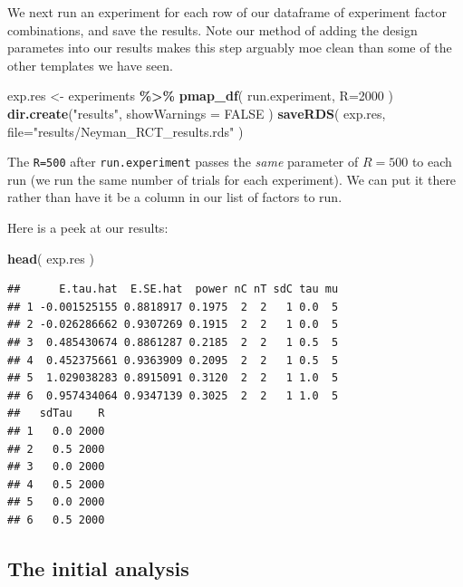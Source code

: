 \documentclass[
]{book}
\newenvironment{Shaded}{\begin{snugshade}}{\end{snugshade}}
\newcommand{\AttributeTok}[1]{\textcolor[rgb]{0.13,0.29,0.53}{#1}}
\newcommand{\ConstantTok}[1]{\textcolor[rgb]{0.56,0.35,0.01}{#1}}
\newcommand{\DecValTok}[1]{\textcolor[rgb]{0.00,0.00,0.81}{#1}}
\newcommand{\FunctionTok}[1]{\textcolor[rgb]{0.13,0.29,0.53}{\textbf{#1}}}
\newcommand{\NormalTok}[1]{#1}
\newcommand{\OtherTok}[1]{\textcolor[rgb]{0.56,0.35,0.01}{#1}}
\newcommand{\SpecialCharTok}[1]{\textcolor[rgb]{0.81,0.36,0.00}{\textbf{#1}}}
\newcommand{\StringTok}[1]{\textcolor[rgb]{0.31,0.60,0.02}{#1}}
\begin{document}
We next run an experiment for each row of our dataframe of experiment factor
combinations, and save the results.
Note our method of adding the design parametes into our results makes this step arguably moe clean than some of the other templates we have seen.

\begin{Shaded}
\begin{Highlighting}[]
\NormalTok{exp.res }\OtherTok{\textless{}{-}}\NormalTok{ experiments }\SpecialCharTok{\%\textgreater{}\%} \FunctionTok{pmap\_df}\NormalTok{( run.experiment, }\AttributeTok{R=}\DecValTok{2000}\NormalTok{ )}
\FunctionTok{dir.create}\NormalTok{(}\StringTok{"results"}\NormalTok{, }\AttributeTok{showWarnings =} \ConstantTok{FALSE}\NormalTok{ )}
\FunctionTok{saveRDS}\NormalTok{( exp.res, }\AttributeTok{file=}\StringTok{"results/Neyman\_RCT\_results.rds"}\NormalTok{ )}
\end{Highlighting}
\end{Shaded}

The \texttt{R=500} after \texttt{run.experiment} passes the \emph{same} parameter of \(R=500\) to each
run (we run the same number of trials for each experiment).
We can put it there rather than have it be a column in our list of factors to run.

Here is a peek at our results:

\begin{Shaded}
\begin{Highlighting}[]
\FunctionTok{head}\NormalTok{( exp.res )}
\end{Highlighting}
\end{Shaded}

\begin{verbatim}
##      E.tau.hat  E.SE.hat  power nC nT sdC tau mu
## 1 -0.001525155 0.8818917 0.1975  2  2   1 0.0  5
## 2 -0.026286662 0.9307269 0.1915  2  2   1 0.0  5
## 3  0.485430674 0.8861287 0.2185  2  2   1 0.5  5
## 4  0.452375661 0.9363909 0.2095  2  2   1 0.5  5
## 5  1.029038283 0.8915091 0.3120  2  2   1 1.0  5
## 6  0.957434064 0.9347139 0.3025  2  2   1 1.0  5
##   sdTau    R
## 1   0.0 2000
## 2   0.5 2000
## 3   0.0 2000
## 4   0.5 2000
## 5   0.0 2000
## 6   0.5 2000
\end{verbatim}

\subsection{The initial analysis}\label{the-initial-analysis}
\end{document}
